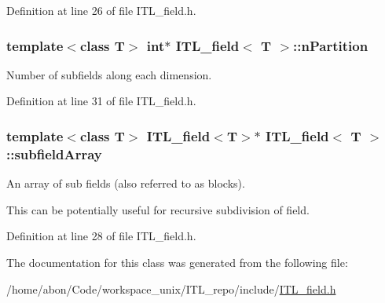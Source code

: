 Definition at line 26 of file ITL\_\-field.h.

\hypertarget{classITL__field_ac5ed068558f49ef1a7113f576e4adfc6}{
\subsubsection[{nPartition}]{\setlength{\rightskip}{0pt plus 5cm}template$<$class T$>$ int$\ast$ {\bf ITL\_\-field}$<$ T $>$::{\bf nPartition}}}
\label{classITL__field_ac5ed068558f49ef1a7113f576e4adfc6}


Number of subfields along each dimension. 



Definition at line 31 of file ITL\_\-field.h.

\hypertarget{classITL__field_a1ade5ffd6676a8df656447ce8512c75e}{
\subsubsection[{subfieldArray}]{\setlength{\rightskip}{0pt plus 5cm}template$<$class T$>$ {\bf ITL\_\-field}$<$T$>$$\ast$ {\bf ITL\_\-field}$<$ T $>$::{\bf subfieldArray}}}
\label{classITL__field_a1ade5ffd6676a8df656447ce8512c75e}


An array of sub fields (also referred to as blocks). 

This can be potentially useful for recursive subdivision of field. 

Definition at line 28 of file ITL\_\-field.h.



The documentation for this class was generated from the following file:\begin{DoxyCompactItemize}
\item 
/home/abon/Code/workspace\_\-unix/ITL\_\-repo/include/\hyperlink{ITL__field_8h}{ITL\_\-field.h}\end{DoxyCompactItemize}
